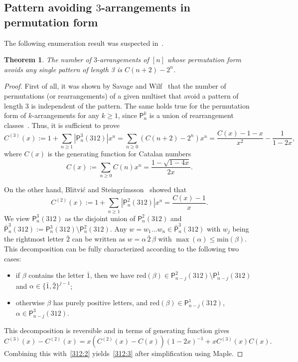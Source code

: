 \documentclass[12pt]{amsart} %
\numberwithin{equation}{section}
\theoremstyle{plain}
\newtheorem{theorem}{Theorem}[section]
\theoremstyle{definition}
\renewcommand\P{\mathsf{P}}
\def\reduction{\mathrm{red}}
\def\max{\mathrm{max}}
\def\min{\mathrm{min}}
\def\max{\operatorname{max}}
\def\neg#1{{{{\bar#1}}}}
\begin{document}
\subsection{Pattern avoiding \texorpdfstring{$3$-arrangements}{3-arrangements} in permutation form}
The following enumeration result was suspected in~\cite[Conj.~2]{bs}.
\begin{theorem}
The number of $3$-arrangements of $[n]$ whose permutation form avoids any single pattern of length 3 is $C(n + 2)-2^n$.
\end{theorem}
\begin{proof}
First of all, it was shown by Savage and Wilf~\cite[Thm.~3]{sav} that the number of permutations (or rearrangements) of a given multiset that avoid a pattern of length $3$ is independent of the pattern. The same holds true for the permutation form of $k$-arrangements for any $k\geq1$, since $\P_n^k$ is  a union of
rearrangement classes~\cite[Prop.~3]{bs}. Thus, it is sufficient to prove 
\begin{equation}\label{312:3}
C^{(3)}(x):=1+\sum_{n\geq1}|\P_n^3(312)|x^n=\sum_{n\geq0}(C(n+2)-2^n)x^n=\frac{C(x)-1-x}{x^2}-\frac{1}{1-2x},
\end{equation}
where $C(x)$ is the generating function for Catalan numbers
$$
C(x):=\sum_{n\geq0}C(n)x^n=\frac{1-\sqrt{1-4x}}{2x}. 
$$

On the other hand, Blitvi\'c and Steingr\'imsson~\cite[Prop.~6]{bs} showed that 
\begin{equation}\label{312:2}
C^{(2)}(x):=1+\sum_{n\geq1}|\P_n^2(312)|x^n=\frac{C(x)-1}{x}. 
\end{equation}
We view $\P_n^3(312)$ as the disjoint union of $\P_n^2(312)$ and $\bar{\P}_n^3(312):=\P_n^3(312)\setminus\P_n^2(312)$.  
Any $w=w_1\ldots w_n\in\bar{\P}_n^3(312)$ with $w_j$ being the rightmost letter $\neg2$ can be written  as $w=\alpha\,\neg2\,\beta$ with $\max(\alpha)\leq \min(\beta)$. This decomposition can be fully characterized according to the following two cases:
\begin{itemize}
\item if $\beta$ contains the letter $\neg 1$, then we have $\reduction(\beta)\in\P_{n-j}^2(312)\setminus\P_{n-j}^1(312)$ and $\alpha\in\{\neg1,\neg2\}^{j-1}$;
\item otherwise $\beta$ has purely positive letters, and $\reduction(\beta)\in\P_{n-j}^1(312)$, $\alpha\in\P_{n-j}^3(312)$. 
\end{itemize}
This decomposition is reversible and in terms of generating function gives 
$$
C^{(3)}(x)-C^{(2)}(x)=x(C^{(2)}(x)-C(x))(1-2x)^{-1}+xC^{(3)}(x)C(x).
$$
Combining this with~\eqref{312:2} yields~\eqref{312:3} after simplification using Maple. 
\end{proof}
\end{document}

